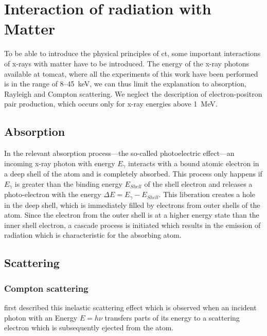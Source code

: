 \section{Interaction of radiation with Matter}
To be able to introduce the physical principles of \ac{ct}, some important interactions of x-rays with matter have to be introduced. The energy of the x-ray photons available at \ac{tomcat}, where all the experiments of this work have been performed is in the range of 8--\SI{45}{\kilo\electronvolt}, we can thus limit the explanation to absorption, Rayleigh and Compton scattering. We neglect the description of electron-positron pair production, which occurs only for x-ray energies above \SI{1}{\mega\electronvolt}.

\subsection{Absorption}\label{sec:absorption}
In the relevant absorption process---the so-called photoelectric effect---an incoming x-ray photon with energy $E_{\gamma}$ interacts with a bound atomic electron in a deep shell of the atom and is completely absorbed. This process only happens if $E_{\gamma}$ is greater than the binding energy $E_{Shell}$ of the shell electron and releases a photo-electron with the energy $\Delta E=E_{\gamma}-E_{Shell}$. This liberation creates a hole in the deep shell, which is immediately filled by electrons from outer shells of the atom. Since the electron from the outer shell is at a higher energy state than the inner shell electron, a cascade process is initiated which results in the emission of radiation which is characteristic for the absorbing atom.

\subsection{Scattering}
\subsubsection{Compton scattering}
\citet{Compton1923} first described this inelastic scattering effect which is observed when an incident photon with an Energy $E=h\nu$ transfers parts of its energy to a scattering electron which is subsequently ejected from the atom.


